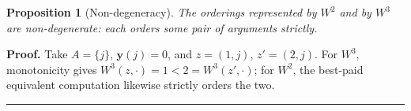 \documentclass[12pt,thmsb]{article}
\newtheorem{proposition}{Proposition}
\newenvironment{proof}[1][Proof]{\noindent \textbf{#1.} }{\  \rule{0.5em}{0.5em}}
\begin{document}
\begin{proposition}[Non-degeneracy]
\label{prop:nondeg}
The orderings represented by $W^2$ and by $W^3$ are non-degenerate: each orders
some pair of arguments strictly.
\end{proposition}

\begin{proof}
Take $A=\{j\}$, $\mathbf y(j)=0$, and $z=(1,j)$, $z'=(2,j)$. For $W^3$,
monotonicity gives $W^3(z,\cdot)=1<2=W^3(z',\cdot)$; for $W^2$, the best-paid
equivalent computation likewise strictly orders the two.
\end{proof}

\end{document}
